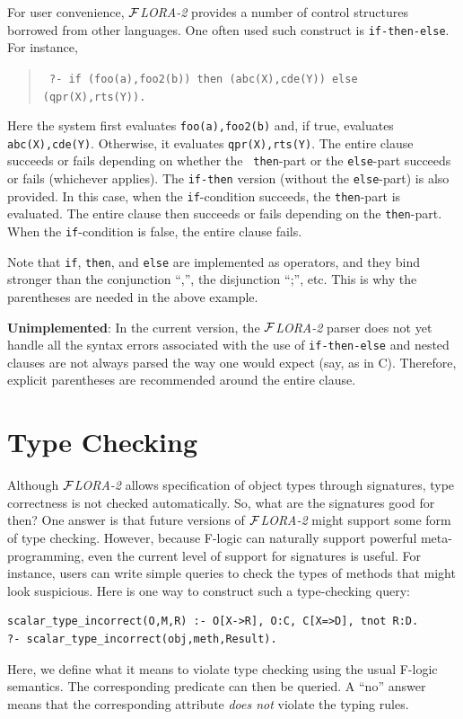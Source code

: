 \documentclass[11pt]{article}
\newcommand{\FLORA}{{\mbox{${\cal F}${\small\it LORA}\rm\emph{-2}}}\xspace}
\newcommand{\fl}{\mbox{F-logic}\xspace}
\begin{document}
For user convenience, \FLORA provides a number of control structures
borrowed from other languages. One often used such construct is
{\tt if-then-else}. For instance, 
\begin{quote}
 \tt
 ?- if (foo(a),foo2(b)) then (abc(X),cde(Y)) else (qpr(X),rts(Y)).
\end{quote}
Here the system first evaluates {\tt foo(a),foo2(b)} and, if true,
evaluates {\tt abc(X),cde(Y)}. Otherwise, it evaluates {\tt qpr(X),rts(Y)}.
The entire clause succeeds or fails depending on whether the {\tt
  then}-part or the {\tt else}-part succeeds or fails (whichever applies).
The {\tt if-then} version (without the {\tt else}-part) is also provided.
In this case, when the {\tt if}-condition succeeds, the {\tt then}-part is
evaluated. The entire clause then succeeds or fails depending on the
{\tt then}-part. When the {\tt if}-condition is false, the entire clause fails.

Note that {\tt if}, {\tt then}, and {\tt else} are implemented as
operators, and they bind stronger than the conjunction ``,'', the
disjunction ``;'', etc. This is why the parentheses are needed in the above
example.

{\bf Unimplemented}: In the current version, the \FLORA parser does not yet
handle all the syntax errors associated with the use of {\tt if-then-else}
and nested clauses are not always parsed the way one would expect (say, as
in C).  Therefore, explicit parentheses are recommended around the entire
clause.



\section{Type Checking}


Although \FLORA allows specification of object types through signatures,
type correctness is not checked automatically. So, what are the
signatures good for then? One answer is that future versions of \FLORA
might support some form of type checking. However, because \fl can
naturally support powerful meta-programming, even the current level
of support for signatures is useful. For instance, users can write
simple queries to check the types of methods that might look suspicious.
Here is one way to construct such a type-checking query:
\begin{verbatim}
scalar_type_incorrect(O,M,R) :- O[X->R], O:C, C[X=>D], tnot R:D.
?- scalar_type_incorrect(obj,meth,Result).
\end{verbatim}
Here, we define what it means to violate type checking using the usual
\fl semantics. The corresponding predicate can then be queried. A
``no'' answer means that the corresponding attribute \emph{does not}
violate the typing rules.
\end{document}
